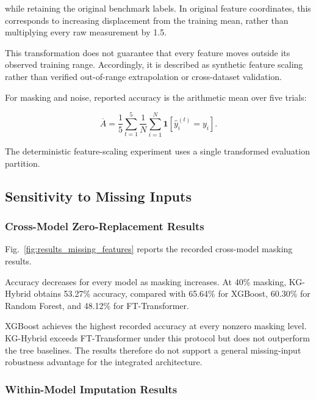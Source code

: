 while retaining the original benchmark labels. In original feature
coordinates, this corresponds to increasing displacement from the
training mean, rather than multiplying every raw measurement by 1.5.

This transformation does not guarantee that every feature moves
outside its observed training range. Accordingly, it is described
as synthetic feature scaling rather than verified out-of-range
extrapolation or cross-dataset validation.

For masking and noise, reported accuracy is the arithmetic mean
over five trials:

\begin{equation}
\overline{A}
=
\frac{1}{5}
\sum_{t=1}^{5}
\frac{1}{N}
\sum_{i=1}^{N}
\mathbf{1}
\left[
\hat{y}_i^{(t)}=y_i
\right].
\label{eq:robustness_average}
\end{equation}

The deterministic feature-scaling experiment uses a single
transformed evaluation partition.

\subsection{Sensitivity to Missing Inputs}

\subsubsection{Cross-Model Zero-Replacement Results}

Fig.~\ref{fig:results_missing_features} reports the recorded cross-model
masking results.



Accuracy decreases for every model as masking increases.
At 40\% masking, KG-Hybrid obtains 53.27\% accuracy,
compared with 65.64\% for XGBoost, 60.30\% for
Random Forest, and 48.12\% for FT-Transformer.

XGBoost achieves the highest recorded accuracy at every nonzero
masking level. KG-Hybrid exceeds FT-Transformer under this protocol
but does not outperform the tree baselines. The results therefore
do not support a general missing-input robustness advantage for
the integrated architecture.

\subsubsection{Within-Model Imputation Results}

